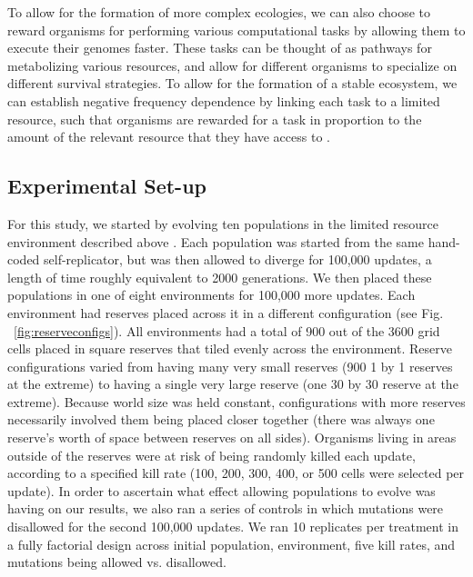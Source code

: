 \documentclass[letterpaper]{article}
\begin{document}
	To allow for the formation of more complex ecologies, we can also choose to reward organisms for performing various computational tasks by allowing them to execute their genomes faster. These tasks can be thought of as pathways for metabolizing various resources, and allow for different organisms to specialize on different survival strategies. To allow for the formation of a stable ecosystem, we can establish negative frequency dependence by linking each task to a limited resource, such that organisms are rewarded for a task in proportion to the amount of the relevant resource that they have access to \citep{chow_adaptive_2004}.
        
\subsection{Experimental Set-up}
        
	For this study, we started by evolving ten populations in the limited resource environment described above \citep{chow_adaptive_2004}. Each population was started from the same hand-coded self-replicator, but was then allowed to diverge for 100,000 updates, a length of time roughly equivalent to 2000 generations. We then placed these populations in one of eight environments for 100,000 more updates. Each environment had reserves placed across it in a different configuration (see Fig. ~\ref{fig:reserveconfigs}). All environments had a total of 900 out of the 3600 grid cells placed in square reserves that tiled evenly across the environment. Reserve configurations varied from having many very small reserves (900 1 by 1 reserves at the extreme) to having a single very large reserve (one 30 by 30 reserve at the extreme). Because world size was held constant, configurations with more reserves necessarily involved them being placed closer together (there was always one reserve's worth of space between reserves on all sides). Organisms living in areas outside of the reserves were at risk of being randomly killed each update, according to a specified kill rate (100, 200, 300, 400, or 500 cells were selected per update). In order to ascertain what effect allowing populations to evolve was having on our results, we also ran a series of controls in which mutations were disallowed for the second 100,000 updates. We ran 10 replicates per treatment in a fully factorial design across initial population, environment, five kill rates, and mutations being allowed vs. disallowed.
%
%
%
%
%
%
%
    
\end{document}
